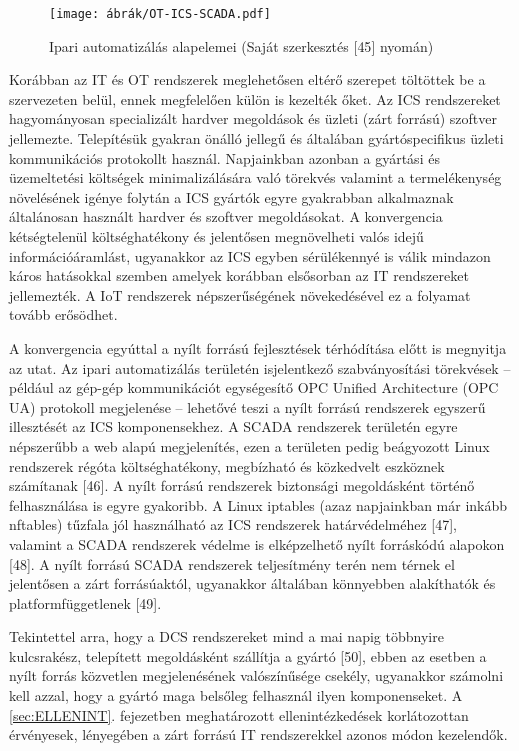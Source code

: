 \documentclass[12pt,magyar,a4paper,oneside]{scrreprt}
\begin{document}
\begin{figure}
\hypertarget{fig:ICS}{%
\centering
\texttt{[image: ábrák/OT-ICS-SCADA.pdf]}
\caption{Ipari automatizálás alapelemei (Saját szerkesztés {[}45{]}
nyomán)}\label{fig:ICS}
}
\end{figure}

Korábban az IT és OT rendszerek meglehetősen eltérő szerepet töltöttek
be a szervezeten belül, ennek megfelelően külön is kezelték őket. Az ICS
rendszereket hagyományosan specializált hardver megoldások és üzleti
(zárt forrású) szoftver jellemezte. Telepítésük gyakran önálló jellegű
és általában gyártóspecifikus üzleti kommunikációs protokollt használ.
Napjainkban azonban a gyártási és üzemeltetési költségek
minimalizálására való törekvés valamint a termelékenység növelésének
igénye folytán a ICS gyártók egyre gyakrabban alkalmaznak általánosan
használt hardver és szoftver megoldásokat. A konvergencia kétségtelenül
költséghatékony és jelentősen megnövelheti valós idejű
információáramlást, ugyanakkor az ICS egyben sérülékennyé is válik
mindazon káros hatásokkal szemben amelyek korábban elsősorban az IT
rendszereket jellemezték. A IoT rendszerek népszerűségének növekedésével
ez a folyamat tovább erősödhet.

A konvergencia egyúttal a nyílt forrású fejlesztések térhódítása előtt
is megnyitja az utat. Az ipari automatizálás területén isjelentkező
szabványosítási törekvések -- például az gép-gép kommunikációt
egységesítő OPC Unified Architecture (OPC UA) protokoll megjelenése --
lehetővé teszi a nyílt forrású rendszerek egyszerű illesztését az ICS
komponensekhez. A SCADA rendszerek területén egyre népszerűbb a web
alapú megjelenítés, ezen a területen pedig beágyozott Linux rendszerek
régóta költséghatékony, megbízható és közkedvelt eszköznek számítanak
{[}46{]}. A nyílt forrású rendszerek biztonsági megoldásként történő
felhasználása is egyre gyakoribb. A Linux iptables (azaz napjainkban már
inkább nftables) tűzfala jól használható az ICS rendszerek
határvédelméhez {[}47{]}, valamint a SCADA rendszerek védelme is
elképzelhető nyílt forráskódú alapokon {[}48{]}. A nyílt forrású SCADA
rendszerek teljesítmény terén nem térnek el jelentősen a zárt
forrásúaktól, ugyanakkor általában könnyebben alakíthatók és
platformfüggetlenek {[}49{]}.

Tekintettel arra, hogy a DCS rendszereket mind a mai napig többnyire
kulcsrakész, telepített megoldásként szállítja a gyártó {[}50{]}, ebben
az esetben a nyílt forrás közvetlen megjelenésének valószínűsége
csekély, ugyanakkor számolni kell azzal, hogy a gyártó maga belsőleg
felhasznál ilyen komponenseket. A \ref{sec:ELLENINT}. fejezetben
meghatározott ellenintézkedések korlátozottan érvényesek, lényegében a
zárt forrású IT rendszerekkel azonos módon kezelendők.
\end{document}
